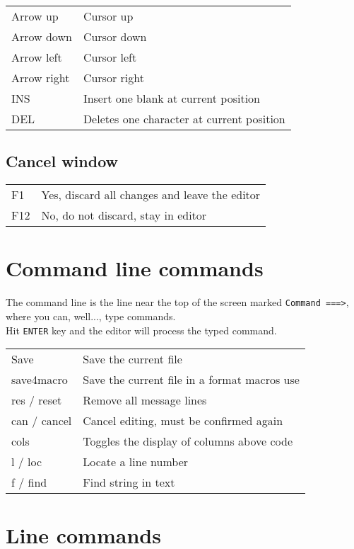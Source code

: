 \documentclass{report}
\begin{document}
\begin{tabular}{l l}
Arrow up & Cursor up \\
Arrow down & Cursor down \\
Arrow left & Cursor left \\
Arrow right & Cursor right \\
INS & Insert one blank at current position \\
DEL & Deletes one character at current position \\
\end{tabular}

\section{Cancel window}

\begin{tabular}{l l}
F1 & Yes, discard all changes and leave the editor \\
F12 & No, do not discard, stay in editor \\
\end{tabular}

\chapter{Command line commands}

The command line is the line near the top of the screen marked \texttt{Command ===>}, where you can, well..., type commands. \\
Hit \texttt{ENTER} key and the editor will process the typed command. \\

\begin{tabular}{l l}
Save & Save the current file \\
save4macro & Save the current file in a format macros use \\
res / reset & Remove all message lines \\
can / cancel & Cancel editing, must be confirmed again \\
cols & Toggles the display of columns above code \\
l / loc & Locate a line number \\
f / find & Find string in text \\
\end{tabular}



\chapter{Line commands}
\end{document}

